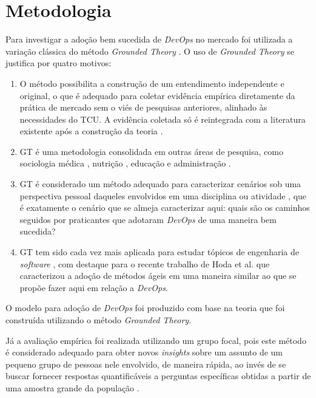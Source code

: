 \section{Metodologia}

Para investigar a adoção bem sucedida de \textit{DevOps} no mercado foi
utilizada a variação clássica do método \textit{Grounded Theory} \cite{glaser1967discovery}.
O uso de \textit{Grounded Theory} se justifica por quatro motivos:

\begin{enumerate}

\item O método possibilita a construção de um entendimento independente e original,
o que é adequado para coletar evidência empírica diretamente da prática de
mercado sem o viés de pesquisas anteriores, alinhado às necessidades do \acrshort{TCU}.
A evidência coletada só é reintegrada com a literatura existente após a
construção da teoria \cite{reconciling_perspectives,stol2016grounded}.

\item \acrshort{GT} é uma metodologia consolidada em outras áreas de
pesquisa, como sociologia médica \cite{gt_medical_sociology}, nutrição
\cite{gt_nursing}, educação \cite{gt_education} e administração
\cite{gt_management,locke2001grounded}.

\item \acrshort{GT} é considerado um método adequado para caracterizar cenários
sob uma perspectiva pessoal daqueles envolvidos em uma disciplina ou atividade \cite{stol2016grounded},
que é exatamente o cenário que se almeja caracterizar aqui: quais são os caminhos
seguidos por praticantes que adotaram \textit{DevOps} de uma maneira bem sucedida?

\item \acrshort{GT} tem sido cada vez mais aplicada para estudar tópicos de
engenharia de \textit{software} \cite{hoda2017becoming,Waterman:2015:ICSE,stol2016grounded},
com destaque para o recente trabalho de Hoda et al. \cite{hoda2017becoming} que
caracterizou a adoção de métodos ágeis em uma maneira similar ao que se propõe
fazer aqui em relação a \textit{DevOps}.

\end{enumerate}

O modelo para adoção de \textit{DevOps} foi produzido com base na teoria
que foi construída utilizando o método \textit{Grounded Theory}.

Já a avaliação empírica foi realizada utilizando um grupo focal, pois este
método é considerado adequado para obter novos \textit{insights} sobre um
assunto de um pequeno grupo de pessoas nele envolvido, de maneira rápida, ao
invés de se buscar fornecer respostas quantificáveis a perguntas específicas
obtidas a partir de uma amostra grande da população \cite{focus_group_handbook,shull2007guide}.

